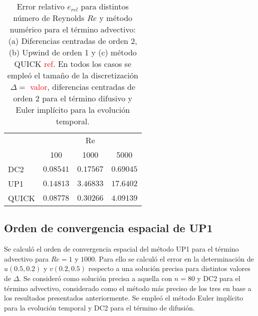 \documentclass[aps,prb,twocolumn,superscriptaddress,floatfix,longbibliography,10pt]{revtex4-2}
\newcounter{para}
\begin{document}



\begin{table}[]
  \begin{tabular}{l|lll|}
  \cline{2-4}
            & \multicolumn{3}{c|}{Re}                                     \\ \cline{2-4} 

            & \multicolumn{1}{c|}{100} & \multicolumn{1}{c|}{1000} &  \multicolumn{1}{c|}{5000} \\ \hline
  \multicolumn{1}{|l|}{DC2} & \multicolumn{1}{c|}{$0.08541$} & \multicolumn{1}{c|}{$0.17567$} & $0.69045$ \\ \hline
  \multicolumn{1}{|l|}{UP1} & \multicolumn{1}{c|}{$0.14813$} & \multicolumn{1}{c|}{$3.46833$} & $17.6402$ \\ \hline
  \multicolumn{1}{|l|}{QUICK} & \multicolumn{1}{c|}{$0.08778$} & \multicolumn{1}{c|}{$0.30266$} & $4.09139$ \\ \hline
  \end{tabular}
  \label{tabla:erel}
  \caption{Error relativo $e_{rel}$ para distintos número de Reynolds $Re$ y método numérico para el término advectivo: (a) Diferencias centradas de orden 2, (b) Upwind de orden 1 y (c) método QUICK \textcolor{red}{ref}. En todos los casos se empleó el tamaño de la discretización $\Delta = $ \textcolor{red}{valor}, diferencias centradas de orden 2 para el término difusivo y Euler implícito para la evolución temporal.}
\end{table}






\subsection{Orden de convergencia espacial de UP1}
Se calculó el orden de convergencia espacial del método UP1 para el término advectivo para $Re = 1$ y $1000$. Para ello se calculó el error en la determinación de $u(0.5, 0.2)$ y $v(0.2, 0.5)$ respecto a una solución precisa para distintos valores de $\Delta$. Se consideró como solución precisa a aquella con $n = 80$ y DC2 para el término advectivo, considerado como el método más preciso de los tres en base a los resultados presentados anteriormente. Se empleó el método Euler implícito para la evolución temporal y DC2 para el término de difusión.
\end{document}
